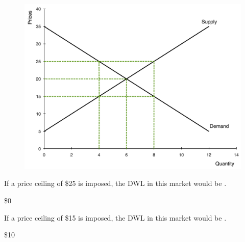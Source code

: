 \documentclass[pdf, handout]{beamer}
\begin{document}
\begin{frame}
	
	\begin{figure}[H]
		\centering
		\includegraphics[scale=.20]{Exam_Review4.pdf}
	\end{figure}

	
	If a price ceiling of \$25 is imposed, the DWL in this market would be \underline{\hspace{2cm}}.
	
	\pause
		\begin{flushright}
			
			\color{red} \$0
			
		\end{flushright}
		
	\pause
	If a price ceiling of \$15 is imposed, the DWL in this market would be \underline{\hspace{2cm}}.
	
		\pause
		\begin{flushright}
			
			\color{red} \$10
			
		\end{flushright}
	
\end{frame}
\end{document}
